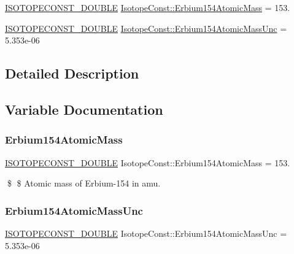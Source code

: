 \begin{DoxyCompactItemize}
\item 
\mbox{\hyperlink{group___isotope_const-_macros_ga8f45a7272ce02c0b4c65c44636ed719a}{I\+S\+O\+T\+O\+P\+E\+C\+O\+N\+S\+T\+\_\+\+D\+O\+U\+B\+LE}} \mbox{\hyperlink{group___isotope_const-_erbium-_er154_gaa3b15fe7ad79a35c7a07cd2ede86818d}{Isotope\+Const\+::\+Erbium154\+Atomic\+Mass}} = 153.
\item 
\mbox{\hyperlink{group___isotope_const-_macros_ga8f45a7272ce02c0b4c65c44636ed719a}{I\+S\+O\+T\+O\+P\+E\+C\+O\+N\+S\+T\+\_\+\+D\+O\+U\+B\+LE}} \mbox{\hyperlink{group___isotope_const-_erbium-_er154_ga727a21c3669ac537d5ba614e41ec0334}{Isotope\+Const\+::\+Erbium154\+Atomic\+Mass\+Unc}} = 5.\+353e-\/06
\end{DoxyCompactItemize}


\subsection{Detailed Description}


\subsection{Variable Documentation}
\mbox{\label{group___isotope_const-_erbium-_er154_gaa3b15fe7ad79a35c7a07cd2ede86818d}} 
\subsubsection{\texorpdfstring{Erbium154\+Atomic\+Mass}{Erbium154AtomicMass}}
{\footnotesize\ttfamily \mbox{\hyperlink{group___isotope_const-_macros_ga8f45a7272ce02c0b4c65c44636ed719a}{I\+S\+O\+T\+O\+P\+E\+C\+O\+N\+S\+T\+\_\+\+D\+O\+U\+B\+LE}} Isotope\+Const\+::\+Erbium154\+Atomic\+Mass = 153.}

\$ \$ Atomic mass of Erbium-\/154 in amu. \mbox{\label{group___isotope_const-_erbium-_er154_ga727a21c3669ac537d5ba614e41ec0334}} 
\subsubsection{\texorpdfstring{Erbium154\+Atomic\+Mass\+Unc}{Erbium154AtomicMassUnc}}
{\footnotesize\ttfamily \mbox{\hyperlink{group___isotope_const-_macros_ga8f45a7272ce02c0b4c65c44636ed719a}{I\+S\+O\+T\+O\+P\+E\+C\+O\+N\+S\+T\+\_\+\+D\+O\+U\+B\+LE}} Isotope\+Const\+::\+Erbium154\+Atomic\+Mass\+Unc = 5.\+353e-\/06}

